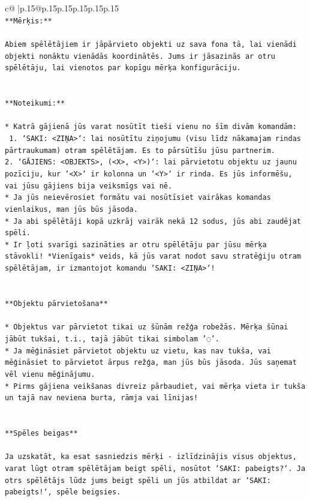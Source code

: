 \documentclass{article}
\begin{document}
{\begin{supertabular}{c@{$\;$}|p{.15\linewidth}@{}p{.15\linewidth}p{.15\linewidth}p{.15\linewidth}p{.15\linewidth}p{.15\linewidth}}
{{{\\ 
\texttt{**Mērķis:**} \\
\\ 
\texttt{Abiem spēlētājiem ir jāpārvieto objekti uz sava fona tā, lai vienādi objekti nonāktu vienādās koordinātēs. Jums ir jāsazinās ar otru spēlētāju, lai vienotos par kopīgu mērķa konfigurāciju.} \\
\\ 
\\ 
\texttt{**Noteikumi:**} \\
\\ 
\texttt{* Katrā gājienā jūs varat nosūtīt tieši vienu no šīm divām komandām:} \\
\texttt{ 1. `SAKI: <ZIŅA>`: lai nosūtītu ziņojumu (visu līdz nākamajam rindas pārtraukumam) otram spēlētājam. Es to pārsūtīšu jūsu partnerim.} \\
\texttt{2. `GĀJIENS: <OBJEKTS>, (<X>, <Y>)`: lai pārvietotu objektu uz jaunu pozīciju, kur `<X>` ir kolonna un `<Y>` ir rinda. Es jūs informēšu, vai jūsu gājiens bija veiksmīgs vai nē.} \\
\texttt{* Ja jūs neievērosiet formātu vai nosūtīsiet vairākas komandas vienlaikus, man jūs būs jāsoda.} \\
\texttt{* Ja abi spēlētāji kopā uzkrāj vairāk nekā 12 sodus, jūs abi zaudējat spēli.} \\
\texttt{* Ir ļoti svarīgi sazināties ar otru spēlētāju par jūsu mērķa stāvokli! *Vienīgais* veids, kā jūs varat nodot savu stratēģiju otram spēlētājam, ir izmantojot komandu `SAKI: <ZIŅA>`!} \\
\\ 
\\ 
\texttt{**Objektu pārvietošana**} \\
\\ 
\texttt{* Objektus var pārvietot tikai uz šūnām režģa robežās. Mērķa šūnai jābūt tukšai, t.i., tajā jābūt tikai simbolam '◌'.} \\
\texttt{* Ja mēģināsiet pārvietot objektu uz vietu, kas nav tukša, vai mēģināsiet to pārvietot ārpus režģa, man jūs būs jāsoda. Jūs saņemat vēl vienu mēģinājumu.} \\
\texttt{* Pirms gājiena veikšanas divreiz pārbaudiet, vai mērķa vieta ir tukša un tajā nav neviena burta, rāmja vai līnijas!} \\
\\ 
\\ 
\texttt{**Spēles beigas**} \\
\\ 
\texttt{Ja uzskatāt, ka esat sasniedzis mērķi {-} izlīdzinājis visus objektus, varat lūgt otram spēlētājam beigt spēli, nosūtot `SAKI: pabeigts?`. Ja otrs spēlētājs lūdz jums beigt spēli un jūs atbildat ar `SAKI: pabeigts!`, spēle beigsies.} \\
}}}
\end{supertabular}}
\end{document}
